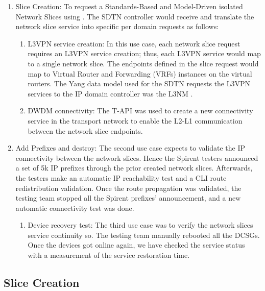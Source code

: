 \documentclass[journal,article,submit,moreauthors,pdftex]{Definitions/mdpi}
\begin{document}
\begin{enumerate}
    \item Slice Creation: To request a Standards-Based and Model-Driven isolated Network Slices using . The SDTN controller would receive and translate the network slice service into specific per domain requests as follows:
    \begin{enumerate}
        \item  L3VPN service creation: In this use case, each network slice request requires an L3VPN service creation; thus, each L3VPN service would map to a single network slice. The endpoints defined in the slice request would map to Virtual Router and Forwarding (VRFs) instances on the virtual routers. The Yang data model used for the SDTN requests the L3VPN services to the IP domain controller was the L3NM \cite{Aguado.2021l3nm}.
        \item  DWDM connectivity: The T-API \cite{vilalta2018experimental} was used to create a new connectivity service in the transport network to enable the L2-L1 communication between the network slice endpoints. 
    \end{enumerate}
    \item Add Prefixes and destroy: The second use case expects to validate the IP connectivity between the network slices. Hence the Spirent testers announced a set of 5k IP prefixes through the prior created network slices. Afterwards, the testers make an automatic IP reachability test and a CLI route redistribution validation. Once the route propagation was validated, the testing team stopped all the Spirent prefixes' announcement, and a new automatic connectivity test was done.  
        \begin{enumerate}
            \item Device recovery test:  The third use case was to verify the network slices service continuity so. The testing team manually rebooted all the DCSGs. Once the devices got online again, we have checked the service status with a measurement of the service restoration time.
      \end{enumerate}
\end{enumerate}

\subsection{Slice Creation}
\end{document}
